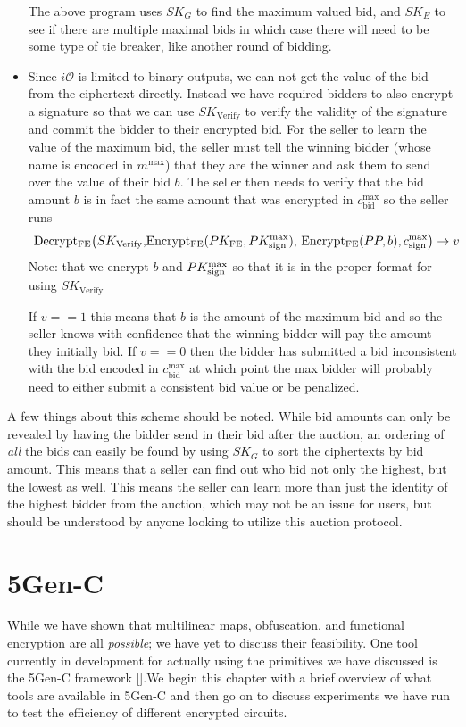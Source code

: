 \documentclass[12pt,twoside]{reedthesis}
\begin{document}
\begin{itemize}
	The above program uses $SK_G$ to find the maximum valued bid, and $SK_E$ to see if there are multiple maximal bids in which case there will need to be some type of tie breaker, like another round of bidding. 
	\item Since $i\mathcal{O}$ is limited to binary outputs, we can not get the value of the bid from the ciphertext directly. Instead we have required bidders to also encrypt a signature so that we can use $SK_\text{Verify}$ to verify the validity of the signature and commit the bidder to their encrypted bid. For the seller to learn the value of the maximum bid, the seller must tell the winning bidder (whose name is encoded in $m^\text{max}$) that they are the winner and ask them to send over the value of their bid $b$. The seller then needs to verify that the bid amount $b$ is in fact the same amount that was encrypted in $c^\text{max}_\text{bid}$ so the seller runs $$\text{ Decrypt$_\text{FE}\big(SK_\text{Verify},$Encrypt$_\text{FE}(PK_\text{FE},PK_\text{sign}^\text{max}),$ Encrypt$_\text{FE}(PP, b),c_\text{sign}^\text{max}$\big)} \to v $$
Note: that we encrypt $b$ and $PK_\text{sign}^\text{max}$ so that it is in the proper format for using $SK_\text{Verify}$

\par If $v==1$ this means that $b$ is the amount of the maximum bid and so the seller knows with confidence that the winning bidder will pay the amount they initially bid. If $v == 0$ then the bidder has submitted a bid inconsistent with the bid encoded in $c_\text{bid}^\text{max}$ at which point the max bidder will probably need to either submit a consistent bid value or be penalized.
       \end{itemize}
       
       \par A few things about this scheme should be noted. While bid amounts can only be revealed by having the bidder send in their bid after the auction, an ordering of \textit{all} the bids can easily be found by using $SK_G$ to sort the ciphertexts by bid amount. This means that a seller can find out who bid not only the highest, but the lowest as well. This means the seller can learn more than just the identity of the highest bidder from the auction, which may not be an issue for users, but should be understood by anyone looking to utilize this auction protocol.    
    
    
    
    
    
    \chapter{5Gen-C}
    \par While we have shown that multilinear maps, obfuscation, and functional encryption are all \textit{possible}; we have yet to discuss their feasibility. One tool currently in development for actually using the primitives we have discussed is the 5Gen-C framework [\cite{5genc}].We begin this chapter with a brief overview of what tools are available in 5Gen-C and then go on to discuss experiments we have run to test the efficiency of different encrypted circuits. 
    
\end{document}
